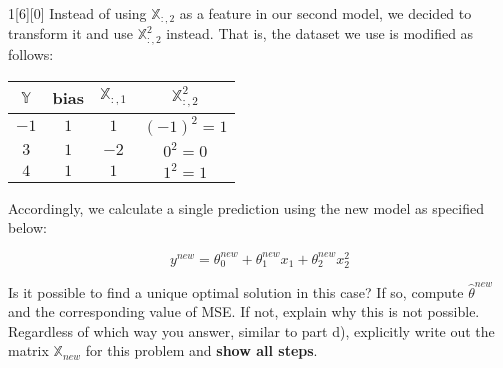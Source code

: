 \documentclass{article}
\begin{document}
\begin{dshw}{1}[6][0]
	Instead of using $\mathbb{X}_{:,2}$ as a feature in our second model, we decided to transform it and use $\mathbb{X}_{:,2}^2$ instead. That is, the dataset we use is modified as follows:
	
	\begin{center}
		\begin{tabular}{|c|c|c|c|}
			\hline
			$\mathbb{Y}$ & bias & $\mathbb{X}_{:,1}$ & $\mathbb{X}_{:,2}^2$ \\
			\hline
			$-1$ & $1$ & $1$ & $(-1)^2 = 1$\\
			$3$ & $1$ & $-2$ & $0^2 = 0$\\
			$4$ & $1$ & $1$ & $1^2 = 1$\\
			\hline
		\end{tabular}
	\end{center}
	
	Accordingly, we calculate a single prediction using the new model as specified below:
	
	$$y^{new} = \theta_0^{new} + \theta_1^{new} x_1 +  \theta_2^{new} x_2^2$$
	
	Is it possible to find a unique optimal solution in this case? If so, compute $\hat{\theta}^{new}$ and the corresponding value of MSE. If not, explain why this is not possible. Regardless of which way you answer, similar to part d), explicitly write out the matrix $\mathbb{X}_{new}$ for this problem and \textbf{show all steps}.
\end{dshw}
\end{document}
